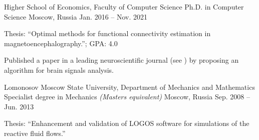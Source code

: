 \begin{cventries}
  \cventry
    {Higher School of Economics, Faculty of Computer Science}
    {Ph.D. in Computer Science}
    {Moscow, Russia}
    {Jan. 2016 -- Nov. 2021}
    {
      \begin{cvitems}
        \item {Thesis: ``Optimal methods for functional connectivity estimation in magnetoencephalography.''; GPA: 4.0}
      \item{Published a paper in a leading neuroscientific journal (see \cite{psiicos}})
          by proposing an algorithm for brain signals analysis.
      \end{cvitems}
    }
  \cventry
    {Lomonosov Moscow State University, Department of Mechanics and Mathematics}
{Specialist degree in Mechanics \emph{(Masters equivalent)}}
    {Moscow, Russia}
    {Sep. 2008 -- Jun. 2013}
    {
      \begin{cvitems}
        \item{Thesis: ``Enhancement and validation of LOGOS software for simulations of the reactive fluid flows.''}
      \end{cvitems}
    }
\end{cventries}
